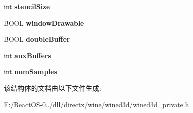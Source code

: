 \begin{DoxyCompactItemize}
int {\bfseries stencil\+Size}
\item 
\mbox{\label{structwined3d__pixel__format_ae7dd98bace7d2bf1d10728ac6f033717}} 
B\+O\+OL {\bfseries window\+Drawable}
\item 
\mbox{\label{structwined3d__pixel__format_ab5815c49eb9bda0730e8d46a11796f4a}} 
B\+O\+OL {\bfseries double\+Buffer}
\item 
\mbox{\label{structwined3d__pixel__format_a274bdaa63a82d933acf9ce8c704143ee}} 
int {\bfseries aux\+Buffers}
\item 
\mbox{\label{structwined3d__pixel__format_af90cb041832f652bca04c5b853933c15}} 
int {\bfseries num\+Samples}
\end{DoxyCompactItemize}


该结构体的文档由以下文件生成\+:\begin{DoxyCompactItemize}
\item 
E\+:/\+React\+O\+S-\/0../dll/directx/wine/wined3d/wined3d\+\_\+private.\+h\end{DoxyCompactItemize}
